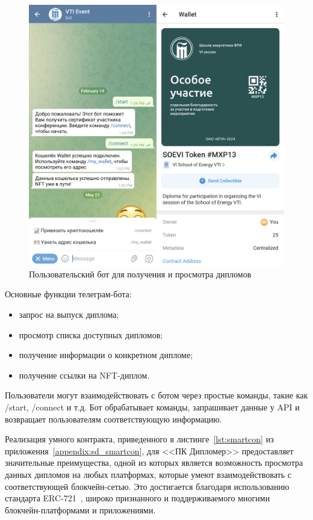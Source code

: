 \begin{figure}[H]
	\centering
	\includegraphics[width=.8\textwidth]{images/3.user_client.png}
	\parskip=6pt
	\caption{Пользовательский бот для получения и просмотра дипломов}
	\label{fig:user_client}
\end{figure}

Основные функции телеграм-бота:
\begin{itemize}
    \item запрос на выпуск диплома;
    \item просмотр списка доступных дипломов;
    \item получение информации о конкретном дипломе;
    \item получение ссылки на NFT-диплом.
\end{itemize}

Пользователи могут взаимодействовать с ботом через простые команды, такие как /start, /connect и т.д. Бот обрабатывает команды, запрашивает данные у API и возвращает пользователям соответствующую информацию.

Реализация умного контракта, приведенного в листинге~\ref{lst:smartcon} из приложения~\ref{appendix:sd_smartcon}, для <<ПК Дипломер>> предоставляет значительные преимущества, одной из которых является возможность просмотра данных дипломов на любых платформах, которые умеют взаимодействовать с соответствующей блокчейн-сетью. Это достигается благодаря использованию стандарта ERC-721~\cite{bib:erc721}, широко признанного и поддерживаемого многими блокчейн-платформами и приложениями.

